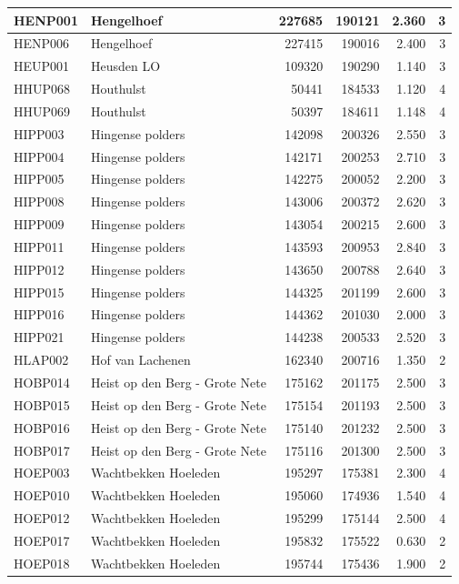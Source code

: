 \documentclass[11pt,]{book}
\begin{document}
\begin{table}
\begin{tabular}[t]{l|l|r|r|r|r}
\hline
HENP001 & Hengelhoef & 227685 & 190121 & 2.360 & 3\\
\hline
HENP006 & Hengelhoef & 227415 & 190016 & 2.400 & 3\\
\hline
HEUP001 & Heusden LO & 109320 & 190290 & 1.140 & 3\\
\hline
HHUP068 & Houthulst & 50441 & 184533 & 1.120 & 4\\
\hline
HHUP069 & Houthulst & 50397 & 184611 & 1.148 & 4\\
\hline
HIPP003 & Hingense polders & 142098 & 200326 & 2.550 & 3\\
\hline
HIPP004 & Hingense polders & 142171 & 200253 & 2.710 & 3\\
\hline
HIPP005 & Hingense polders & 142275 & 200052 & 2.200 & 3\\
\hline
HIPP008 & Hingense polders & 143006 & 200372 & 2.620 & 3\\
\hline
HIPP009 & Hingense polders & 143054 & 200215 & 2.600 & 3\\
\hline
HIPP011 & Hingense polders & 143593 & 200953 & 2.840 & 3\\
\hline
HIPP012 & Hingense polders & 143650 & 200788 & 2.640 & 3\\
\hline
HIPP015 & Hingense polders & 144325 & 201199 & 2.600 & 3\\
\hline
HIPP016 & Hingense polders & 144362 & 201030 & 2.000 & 3\\
\hline
HIPP021 & Hingense polders & 144238 & 200533 & 2.520 & 3\\
\hline
HLAP002 & Hof van Lachenen & 162340 & 200716 & 1.350 & 2\\
\hline
HOBP014 & Heist op den Berg - Grote Nete & 175162 & 201175 & 2.500 & 3\\
\hline
HOBP015 & Heist op den Berg - Grote Nete & 175154 & 201193 & 2.500 & 3\\
\hline
HOBP016 & Heist op den Berg - Grote Nete & 175140 & 201232 & 2.500 & 3\\
\hline
HOBP017 & Heist op den Berg - Grote Nete & 175116 & 201300 & 2.500 & 3\\
\hline
HOEP003 & Wachtbekken Hoeleden & 195297 & 175381 & 2.300 & 4\\
\hline
HOEP010 & Wachtbekken Hoeleden & 195060 & 174936 & 1.540 & 4\\
\hline
HOEP012 & Wachtbekken Hoeleden & 195299 & 175144 & 2.500 & 4\\
\hline
HOEP017 & Wachtbekken Hoeleden & 195832 & 175522 & 0.630 & 2\\
\hline
HOEP018 & Wachtbekken Hoeleden & 195744 & 175436 & 1.900 & 2\\

\end{tabular}
\end{table}
\end{document}
